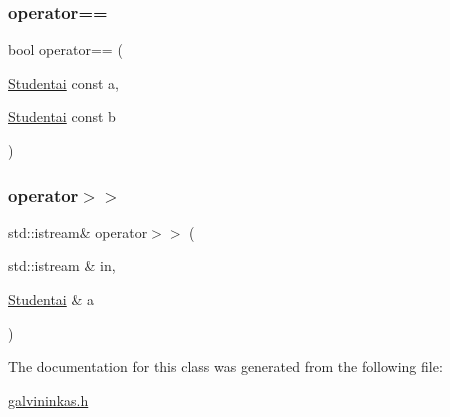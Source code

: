 \mbox{\label{class_studentai_ac99b39ba6f9310f2348d362ed1f67fd5}} 
\subsubsection{\texorpdfstring{operator==}{operator==}}
{\footnotesize\ttfamily bool operator== (\begin{DoxyParamCaption}\item[{\mbox{\hyperlink{class_studentai}{Studentai}} const}]{a,  }\item[{\mbox{\hyperlink{class_studentai}{Studentai}} const}]{b }\end{DoxyParamCaption})\hspace{0.3cm}{\ttfamily [friend]}}

\mbox{\label{class_studentai_a26a2195becea6f359ea305a80239387e}} 
\subsubsection{\texorpdfstring{operator$>$$>$}{operator>>}}
{\footnotesize\ttfamily std\+::istream\& operator$>$$>$ (\begin{DoxyParamCaption}\item[{std\+::istream \&}]{in,  }\item[{\mbox{\hyperlink{class_studentai}{Studentai}} \&}]{a }\end{DoxyParamCaption})\hspace{0.3cm}{\ttfamily [friend]}}



The documentation for this class was generated from the following file\+:\begin{DoxyCompactItemize}
\item 
\mbox{\hyperlink{galvininkas_8h}{galvininkas.\+h}}\end{DoxyCompactItemize}
